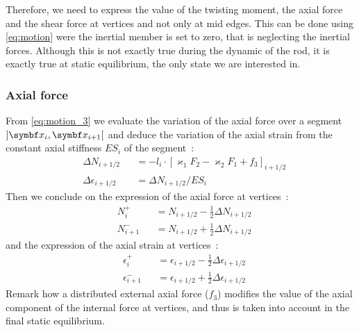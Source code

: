 Therefore, we need to express the value of the twisting moment, the axial force and the shear force at vertices and not only at mid edges. This can be done using \cref{eq:motion} were the inertial member is set to zero, that is neglecting the inertial forces. Although this is not exactly true during the dynamic of the rod, it is exactly true at static equilibrium, the only state we are interested in.

\subsubsection{Axial force}
From \cref{eq:motion_3} we evaluate the variation of the axial force over a segment $]\vect{x}_{i},  \vect{x}_{i+1}[$ and deduce the variation of the axial strain from the constant axial stiffness $ES_i$ of the segment~:
\begin{subequations}
	\begin{alignat}{2}
		&\Delta N_{i+1/2} &&= -l_i  \cdot {[\varkappa_1 F_2 - \varkappa_2 F_1 + f_3]}_{i+1/2}
		\label{eq:DeltaN}
		\\
		&\Delta \epsilon_{i+1/2} &&= \Delta N_{i+1/2} / {ES}_i
	\end{alignat}
\end{subequations}
Then we conclude on the expression of the axial force at vertices~:
\begin{subequations}
	\begin{alignat}{2}
		&N_{i}^{+} &&= N_{i+1/2} - \frac{1}{2} \Delta N_{i+1/2}  \\[0.5em]
		&N_{i+1}^{-} &&= N_{i+1/2} + \frac{1}{2} \Delta N_{i+1/2}
	\end{alignat}
	\label{eq:dNi}
\end{subequations}
and the expression of the axial strain at vertices~:
\begin{subequations}
	\begin{alignat}{2}
		&\epsilon_{i}^{+} &&= \epsilon_{i+1/2} - \frac{1}{2} \Delta \epsilon_{i+1/2}  \\[0.5em]
		&\epsilon_{i+1}^{-} &&= \epsilon_{i+1/2} + \frac{1}{2} \Delta \epsilon_{i+1/2}
	\end{alignat}
\end{subequations}
Remark how a distributed external axial force (${f}_3$) modifies the value of the axial component of the internal force at vertices, and thus is taken into account in the final static equilibrium.

